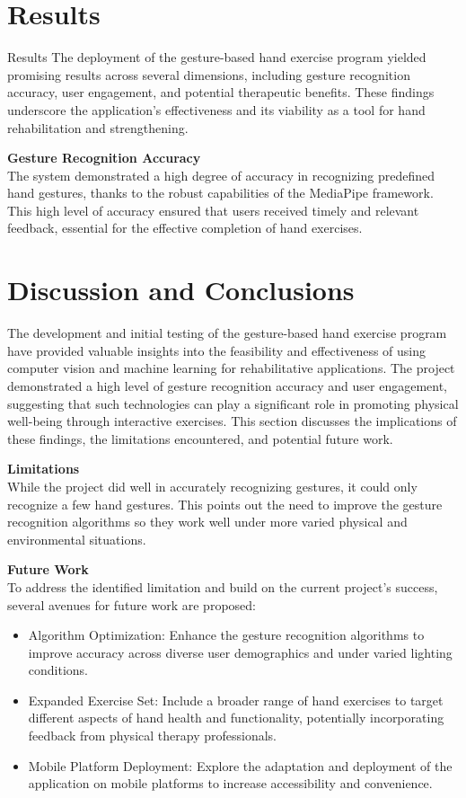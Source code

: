 \documentclass[12pt, letterpaper, twoside]{article}
\begin{document}
\section{Results}

    Results
    The deployment of the gesture-based hand exercise program yielded promising results across several dimensions, including gesture recognition accuracy, user engagement, and potential therapeutic benefits. These findings underscore the application's effectiveness and its viability as a tool for hand rehabilitation and strengthening.
    
    \textbf{Gesture Recognition Accuracy}
    \\The system demonstrated a high degree of accuracy in recognizing predefined hand gestures, thanks to the robust capabilities of the MediaPipe framework. This high level of accuracy ensured that users received timely and relevant feedback, essential for the effective completion of hand exercises.

\section{Discussion and Conclusions}
    The development and initial testing of the gesture-based hand exercise program have provided valuable insights into the feasibility and effectiveness of using computer vision and machine learning for rehabilitative applications. The project demonstrated a high level of gesture recognition accuracy and user engagement, suggesting that such technologies can play a significant role in promoting physical well-being through interactive exercises. This section discusses the implications of these findings, the limitations encountered, and potential future work.

    \textbf{Limitations}
    \\While the project did well in accurately recognizing gestures, it could only recognize a few hand gestures. This points out the need to improve the gesture recognition algorithms so they work well under more varied physical and environmental situations.
    
    \textbf{Future Work}
    \\To address the identified limitation and build on the current project's success, several avenues for future work are proposed:

    \begin{itemize}
        \item Algorithm Optimization: Enhance the gesture recognition algorithms to improve accuracy across diverse user demographics and under varied lighting conditions.
        \item Expanded Exercise Set: Include a broader range of hand exercises to target different aspects of hand health and functionality, potentially incorporating feedback from physical therapy professionals.
        \item Mobile Platform Deployment: Explore the adaptation and deployment of the application on mobile platforms to increase accessibility and convenience.
    \end{itemize}
    
\end{document}
